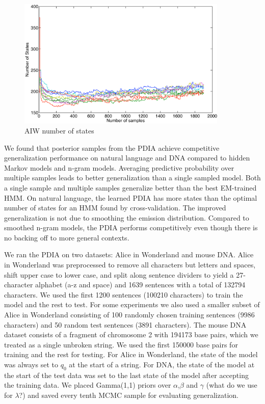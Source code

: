 \begin{figure}[htbp]
\begin{center}
\includegraphics[width=10cm]{results/aiw_small_numstates}
\caption{AIW number of states}
\label{fig:aiw_small_numstates}
\end{center}
\end{figure}

We found that posterior samples from the PDIA achieve competitive generalization performance on natural language and DNA compared to hidden Markov models and n-gram models.  Averaging predictive probability over multiple samples leads to better generalization than a single sampled model.  Both a single sample and multiple samples generalize better than the best EM-trained HMM.  On natural language, the learned PDIA has more states than the optimal number of states for an HMM found by cross-validation.  The improved generalization is not due to smoothing the emission distribution.  Compared to smoothed n-gram models, the PDIA performs competitively even though there is no backing off to more general contexts.

We ran the PDIA on two datasets: Alice in Wonderland and mouse DNA.  Alice in Wonderland was preprocessed to remove all characters but letters and spaces, shift upper case to lower case, and split along sentence dividers to yield a 27-character alphabet (a-z and space) and 1639 sentences with a total of 132794 characters.  We used the first 1200 sentences (100210 characters) to train the model and the rest to test.  For some experiments we also used a smaller subset of Alice in Wonderland consisting of 100 randomly chosen training sentences (9986 characters) and 50 random test sentences (3891 characters).  The mouse DNA dataset consists of a fragment of chromosome 2 with 194173 base pairs, which we treated as a single unbroken string.  We used the first 150000 base pairs for training and the rest for testing.  For Alice in Wonderland, the state of the model was always set to $q_0$ at the start of a string.  For DNA, the state of the model at the start of the test data was set to the last state of the model after accepting the training data.  We placed Gamma(1,1) priors over $\alpha$,$\beta$ and $\gamma$ (what do we use for $\lambda$?) and saved every tenth MCMC sample for evaluating generalization.

